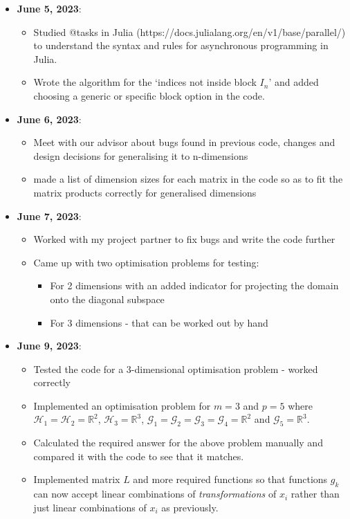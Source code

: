 \documentclass[a4paper,11pt,fleqn]{article}
\theoremstyle{plain}{\theorembodyfont{\rmfamily}%
\newtheorem{conjecture}[theorem]{Conjecture}}
\theoremstyle{plain}{\theorembodyfont{\rmfamily}%
\newtheorem{example}[theorem]{Example}}
\theoremstyle{plain}{\theorembodyfont{\rmfamily}%
\newtheorem{remark}[theorem]{Remark}}
\theoremstyle{plain}{\theorembodyfont{\rmfamily}%
\newtheorem{algorithm}[theorem]{Algorithm}}
\theoremstyle{plain}{\theorembodyfont{\rmfamily}%
\newtheorem{condition}[theorem]{Condition}}
\theoremstyle{plain}{\theorembodyfont{\rmfamily}%
\newtheorem{definition}[theorem]{Definition}}
\theoremstyle{plain}{\theorembodyfont{\rmfamily}
\newtheorem{fact}[theorem]{Fact}}
\theoremstyle{plain}{\theorembodyfont{\rmfamily}
\newtheorem{problem}[theorem]{Problem}}
\theoremstyle{plain}{\theorembodyfont{\rmfamily}
\newtheorem{notation}[theorem]{Notation}}
\theoremstyle{plain}{\theorembodyfont{\rmfamily}
\newtheorem{project}[theorem]{Project}}
\begin{document}
\begin{itemize}
\item {\bf June 5, 2023}:
\begin{itemize} 
\item Studied @tasks in Julia (https://docs.julialang.org/en/v1/base/parallel/) to understand the syntax and rules for asynchronous programming in Julia.
\item Wrote the algorithm for the `indices not inside block $I_n$' and added choosing a generic or specific block option in the code.
\end{itemize}

\item {\bf June 6, 2023}:
\begin{itemize} 
\item Meet with our advisor about bugs found in previous code, changes and design decisions for generalising it to n-dimensions
\item made a list of dimension sizes for each matrix in the code so as to fit the matrix products correctly for generalised dimensions
\end{itemize}

\item {\bf June 7, 2023}:
\begin{itemize} 
\item Worked with my project partner to fix bugs and write the code further
\item Came up with two optimisation problems for testing:
\begin{itemize}
  \item For 2 dimensions with an added indicator for projecting the domain onto the diagonal subspace
  \item For 3 dimensions - that can be worked out by hand
\end{itemize}
\end{itemize}

\item {\bf June 9, 2023}:
\begin{itemize} 
\item Tested the code for a 3-dimensional optimisation problem - worked correctly
\item Implemented an optimisation problem for $m = 3$ and $p = 5$ where $\mathcal{H}_1 = \mathcal{H}_2 = \mathbb{R}^2$, $\mathcal{H}_3 = \mathbb{R}^3$, $\mathscr{G}_1 = \mathscr{G}_2 = \mathscr{G}_3 = \mathscr{G}_4 = \mathbb{R}^2$ and $\mathscr{G}_5 = \mathbb{R}^3$. 
\item Calculated the required answer for the above problem manually and compared it with the code to see that it matches.
\item Implemented matrix $L$ and more required functions so that functions $g_k$ can now accept linear combinations of \textit{transformations} of $x_i$ rather than just linear combinations of $x_i$ as previously.
\end{itemize}


\end{itemize}
\end{document}
